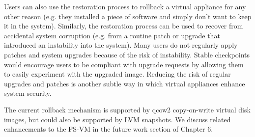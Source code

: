 Users can also use the restoration process to rollback a virtual appliance for any other reason (e.g. they installed a piece of software and simply don’t want to keep it in the system). Similarly, the restoration process can be used to recover from accidental system corruption (e.g. from a routine patch or upgrade that introduced an instability into the system). Many users do not regularly apply patches and system upgrades because of the risk of instability. Stable checkpoints would encourage users to be compliant with upgrade requests by allowing them to easily experiment with the upgraded image. Reducing the risk of regular upgrades and patches is another subtle way in which virtual appliances enhance system security.

The current rollback mechanism is supported by qcow2 copy-on-write virtual disk images, but could also be supported by LVM snapshots. We discuss related enhancements to the FS-VM in the future work section of Chapter 6.


